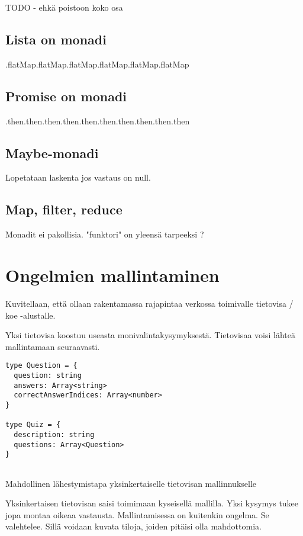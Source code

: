 TODO - ehkä poistoon koko osa

\subsection{Lista on monadi}
.flatMap.flatMap.flatMap.flatMap.flatMap.flatMap

\subsection{Promise on monadi}

.then.then.then.then.then.then.then.then.then.then
\subsection{Maybe-monadi}

Lopetataan laskenta jos vastaus on null.

\subsection{Map, filter, reduce}

Monadit ei pakollisia. "funktori" on yleensä tarpeeksi ?

\section{Ongelmien mallintaminen}

Kuvitellaan, että ollaan rakentamassa rajapintaa verkossa toimivalle tietovisa / koe -alustalle.

Yksi tietovisa koostuu useasta monivalintakysymyksestä. Tietovisaa voisi lähteä mallintamaan seuraavasti.

\begin{code}
    \begin{verbatim}
type Question = {
  question: string
  answers: Array<string>
  correctAnswerIndices: Array<number>
}

type Quiz = {
  description: string
  questions: Array<Question>
}
         
\end{verbatim}
    \caption{Mahdollinen lähestymistapa yksinkertaiselle tietovisan mallinnukselle}
    \label{code:ts_first_quiz}
\end{code}

Yksinkertaisen tietovisan saisi toimimaan kyseisellä mallilla. Yksi kysymys tukee jopa montaa oikeaa vastausta.
Mallintamisessa on kuitenkin ongelma. Se valehtelee. Sillä voidaan kuvata tiloja, joiden pitäisi olla mahdottomia.

